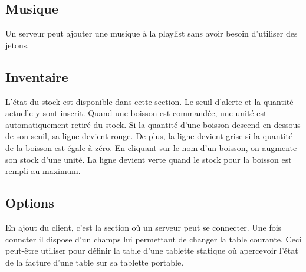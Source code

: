 ﻿\documentclass[a4paper,11pt]{article}
\begin{document}
\subsection{Musique}
Un serveur peut ajouter une musique à la playlist sans avoir besoin d'utiliser des jetons.

\subsection{Inventaire}
L'état du stock est disponible dans cette section. Le seuil d'alerte et la quantité actuelle y sont inscrit. Quand une boisson est commandée, une unité est automatiquement retiré du stock. Si la quantité d'une boisson descend en dessous de son seuil, sa ligne devient rouge. De plus, la ligne devient grise si la quantité de la boisson est égale à zéro. En cliquant sur le nom d'un boisson, on augmente son stock d'une unité. La ligne devient verte quand le stock pour la boisson est rempli au maximum.

\subsection{Options}

En ajout du client, c'est la section où un serveur peut se connecter. Une fois conncter il dispose d'un champs lui permettant de changer la table courante. Ceci peut-être utiliser pour définir la table d'une tablette statique où apercevoir l'état de la facture d'une table sur sa tablette portable.
\end{document}
